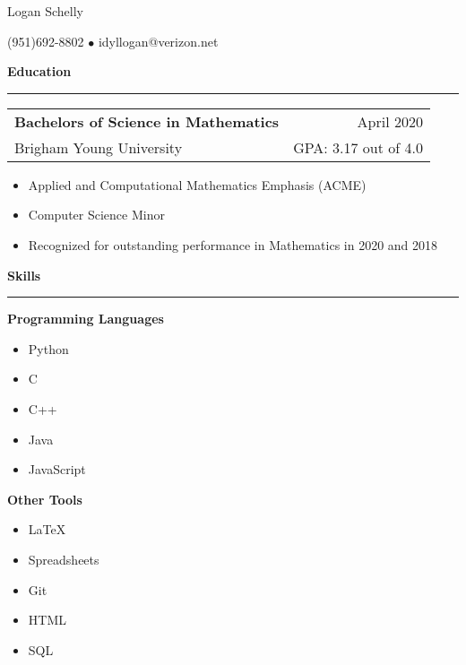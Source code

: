 \documentclass{article}
\newenvironment{compactItemize}{
  \begin{itemize}[itemsep=0ex, parsep=0ex, partopsep=0ex, topsep= -7pt]
}{
  \end{itemize}
}
\newcommand{\jobInfo}[4]{
  \begingroup
  \setlength{\tabcolsep}{0ex}
  \begin{tabularx}{\linewidth}{X r}
    #1 & %
    #2\\ %
    #3 & %
    #4   %
  \end{tabularx}%
  \endgroup%
}
\newcommand{\degree}[4]{
  \jobInfo{\textbf{#1}}{#2}{#3}{#4}
}
\begin{document}
\begin{center}
{\Large Logan Schelly} %

(951)\phantom{-}692-8802 %
$\bullet$ %
idyllogan@verizon.net %
\end{center}
\begin{comment}
\textbf{Objective}
\smallskip
\hrule
I am a recent graduate.
My ultimate career goal would be to work on a project like Intel's Math Kernel Library.
For the time being I am looking for an entry-level job in software, data, or (if possible) high performance computing.
\end{comment}
\textbf{Education}
\smallskip
\hrule

\degree{Bachelors of Science in Mathematics}{April 2020}{Brigham Young University}{GPA: 3.17 out of 4.0}
%
\vspace{-1ex}
\begin{compactItemize}
  \item Applied and Computational Mathematics Emphasis (ACME)
  \item Computer Science Minor
  \item Recognized for outstanding performance in Mathematics in 2020 and 2018
\end{compactItemize}
\bigskip
\textbf{Skills}
\smallskip
\hrule
\textbf{Programming Languages}
\begin{multicols}{3}
\begin{compactItemize}
  \item Python
  \item C
  \item C++
  \item Java
  \item JavaScript
\end{compactItemize}
\end{multicols}

\textbf{Other Tools}
\begin{multicols}{3}
  \begin{compactItemize}
    \item \LaTeX
    \item Spreadsheets
    \item Git
    \item HTML
    \item SQL
  \end{compactItemize}
\end{multicols}
\end{document}
